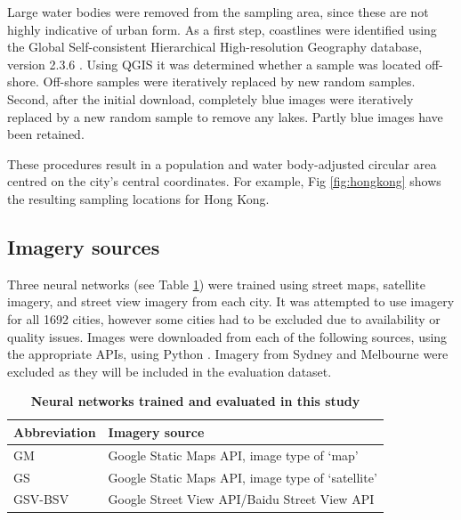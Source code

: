 \documentclass[10pt,letterpaper,hidelinks]{article}
\begin{document}
Large water bodies were removed from the sampling area, since these are not highly indicative of urban form. As a first step, coastlines were identified using the Global Self-consistent Hierarchical High-resolution Geography database, version 2.3.6 \cite{Wessel1996}. Using QGIS \cite{QGIS2009} it was determined whether a sample was located off-shore. Off-shore samples were iteratively replaced by new random samples. Second, after the initial download, completely blue images were iteratively replaced by a new random sample to remove any lakes. Partly blue images have been retained.

These procedures result in a population and water body-adjusted circular area centred on the city's central coordinates. For example, Fig \ref{fig:hongkong} shows the resulting sampling locations for Hong Kong.


\label{methodsimagery}
\subsection*{Imagery sources}

Three neural networks (see Table \ref{tab:neuralnetworks}) were trained using street maps, satellite imagery, and street view imagery from each city. It was attempted to use imagery for all 1692 cities, however some cities had to be excluded due to availability or quality issues. Images were downloaded from each of the following sources, using the appropriate APIs, using Python \cite{Python2016}. Imagery from Sydney and Melbourne were excluded as they will be included in the evaluation dataset. 


\begin{table}[!htbp]
\caption{\bf Neural networks trained and evaluated in this study \label{tab:neuralnetworks}}     
\begin{tabular}{ l l }
 \hline Abbreviation   &  Imagery source \\ \hline
GM & Google Static Maps API, image type of `map'     \\ 
GS & Google Static Maps API, image type of `satellite'      \\
GSV-BSV & Google Street View API/Baidu Street View API     \\ \hline

\end{tabular}
\end{table}
\end{document}

